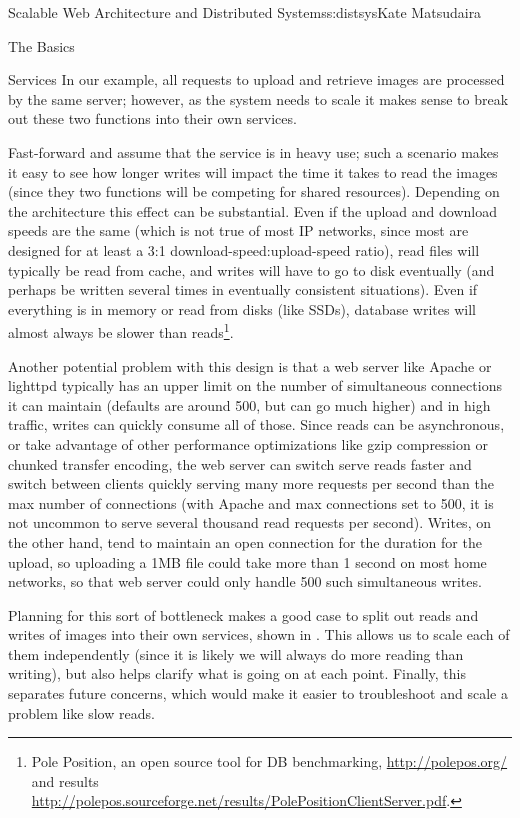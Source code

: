 \begin{aosachapter}{Scalable Web Architecture and Distributed Systems}{s:distsys}{Kate Matsudaira}
\begin{aosasect1}{The Basics}
\begin{aosasect2}{Services}
In our example, all requests to upload and retrieve images are
processed by the same server; however, as the system needs to
scale it makes sense to break out these two functions into
their own services.

Fast-forward and assume that the service is in heavy use; such a
scenario makes it easy to see how longer writes will impact the time it takes
to read the images (since they two functions will be competing for
shared resources). Depending on the architecture this effect can be
substantial. Even if the upload and download speeds are the same
(which is not true of most IP networks, since most are designed for at
least a 3:1 download-speed:upload-speed ratio), read files will typically be read
from cache, and writes will have to go to disk eventually (and perhaps
be written several times in eventually consistent situations).
Even if everything is in memory or read from disks (like SSDs),
database writes will almost always be slower than reads\footnote{Pole
  Position, an open source tool for DB benchmarking,
  \url{http://polepos.org/} and results
  \url{http://polepos.sourceforge.net/results/PolePositionClientServer.pdf}.}.

Another potential problem with this design is that a web server like
Apache or lighttpd typically has an upper limit on the number of
simultaneous connections it can maintain
(defaults are around 500, but can go much higher) and in
high traffic, writes can quickly consume all of those. Since reads can
be asynchronous, or take advantage of other performance optimizations
like gzip compression or chunked transfer encoding, the web server can
switch serve reads faster and switch between clients quickly serving
many more requests per second than the max number of connections (with
Apache and max connections set to 500, it is not uncommon to serve
several thousand read requests per second). Writes, on the other hand,
tend to maintain an open connection for the duration for the upload,
so uploading a 1MB file could take more than 1 second on most home networks,
so that web server could only handle 500 such simultaneous
writes.

Planning for this sort of bottleneck makes a good case
to split out reads and writes of images into their own
services, shown in . This allows us to scale each of them independently (since it
is likely we will always do more reading than writing), but also helps
clarify what is going on at each point. Finally, this separates future
concerns, which would make it easier to troubleshoot and scale a
problem like slow reads.


\end{aosasect2}
\end{aosasect1}
\end{aosachapter}

